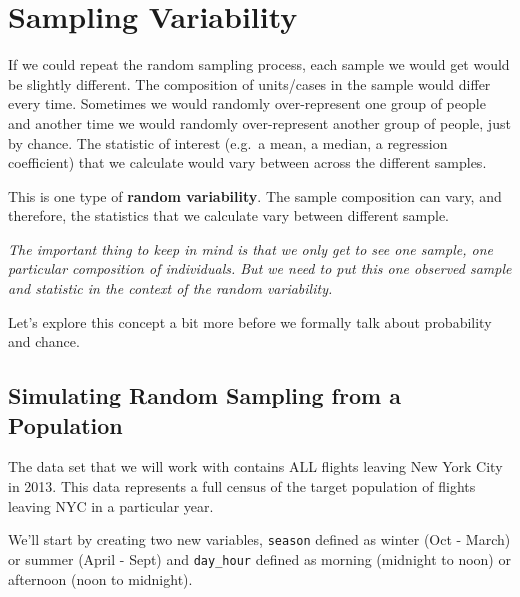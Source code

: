 \documentclass[
]{book}
\begin{document}
\section{Sampling Variability}\label{sampling-variability}

If we could repeat the random sampling process, each sample we would get would be slightly different. The composition of units/cases in the sample would differ every time. Sometimes we would randomly over-represent one group of people and another time we would randomly over-represent another group of people, just by chance. The statistic of interest (e.g.~a mean, a median, a regression coefficient) that we calculate would vary between across the different samples.

This is one type of \textbf{random variability}. The sample composition can vary, and therefore, the statistics that we calculate vary between different sample.

\emph{The important thing to keep in mind is that we only get to see one sample, one particular composition of individuals. But we need to put this one observed sample and statistic in the context of the random variability.}

Let's explore this concept a bit more before we formally talk about probability and chance.

\subsection{Simulating Random Sampling from a Population}\label{simulating-random-sampling-from-a-population}

The data set that we will work with contains ALL flights leaving New York City in 2013. This data represents a full census of the target population of flights leaving NYC in a particular year.

We'll start by creating two new variables, \texttt{season} defined as winter (Oct - March) or summer (April - Sept) and \texttt{day\_hour} defined as morning (midnight to noon) or afternoon (noon to midnight).
\end{document}
